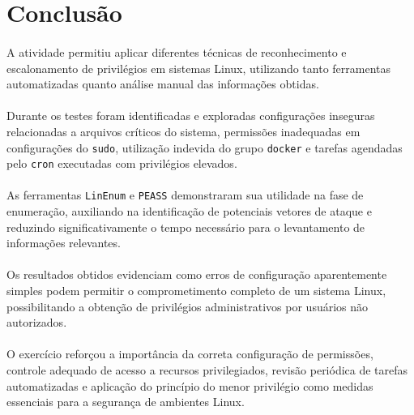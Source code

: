 \section{Conclusão}

\paragraph{}
A atividade permitiu aplicar diferentes técnicas de reconhecimento e
escalonamento de privilégios em sistemas Linux, utilizando tanto ferramentas
automatizadas quanto análise manual das informações obtidas.

\paragraph{}
Durante os testes foram identificadas e exploradas configurações inseguras
relacionadas a arquivos críticos do sistema, permissões inadequadas em
configurações do \texttt{sudo}, utilização indevida do grupo \texttt{docker} e
tarefas agendadas pelo \texttt{cron} executadas com privilégios elevados.

\paragraph{}
As ferramentas \texttt{LinEnum} e \texttt{PEASS} demonstraram sua utilidade na
fase de enumeração, auxiliando na identificação de potenciais vetores de ataque
e reduzindo significativamente o tempo necessário para o levantamento de
informações relevantes.

\paragraph{}
Os resultados obtidos evidenciam como erros de configuração aparentemente
simples podem permitir o comprometimento completo de um sistema Linux,
possibilitando a obtenção de privilégios administrativos por usuários não
autorizados.

\paragraph{}
O exercício reforçou a importância da correta configuração de permissões,
controle adequado de acesso a recursos privilegiados, revisão periódica de
tarefas automatizadas e aplicação do princípio do menor privilégio como medidas
essenciais para a segurança de ambientes Linux.
